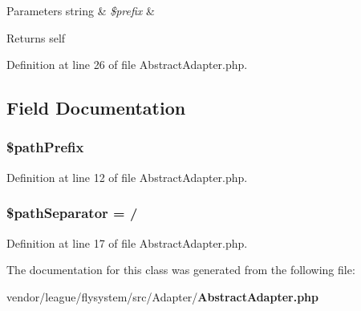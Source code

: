 \begin{DoxyParams}[1]{Parameters}
string & {\em \$prefix} & \\
\hline
\end{DoxyParams}
\begin{DoxyReturn}{Returns}
self 
\end{DoxyReturn}


Definition at line 26 of file Abstract\+Adapter.\+php.



\subsection{Field Documentation}
\subsubsection[{\$path\+Prefix}]{\setlength{\rightskip}{0pt plus 5cm}\$path\+Prefix\hspace{0.3cm}{\ttfamily [protected]}}\label{class_league_1_1_flysystem_1_1_adapter_1_1_abstract_adapter_a399b65ef8f8c701ad0f4440c94b41f51}


Definition at line 12 of file Abstract\+Adapter.\+php.

\subsubsection[{\$path\+Separator}]{\setlength{\rightskip}{0pt plus 5cm}\$path\+Separator = \textquotesingle{}/\textquotesingle{}\hspace{0.3cm}{\ttfamily [protected]}}\label{class_league_1_1_flysystem_1_1_adapter_1_1_abstract_adapter_aa7b0e617adb9b3201d09879ca707d3ef}


Definition at line 17 of file Abstract\+Adapter.\+php.



The documentation for this class was generated from the following file\+:\begin{DoxyCompactItemize}
\item 
vendor/league/flysystem/src/\+Adapter/{\bf Abstract\+Adapter.\+php}\end{DoxyCompactItemize}
